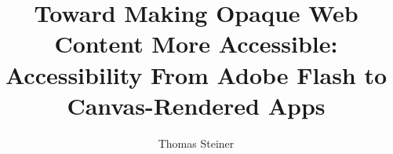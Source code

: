 \documentclass[sigconf]{acmart}
\begin{document}
\title[Toward Making Opaque Web Content More Accessible]{Toward Making Opaque Web Content More Accessible: \protect\\ Accessibility From Adobe Flash to Canvas-Rendered Apps}

\author{Thomas Steiner}

\end{document}
